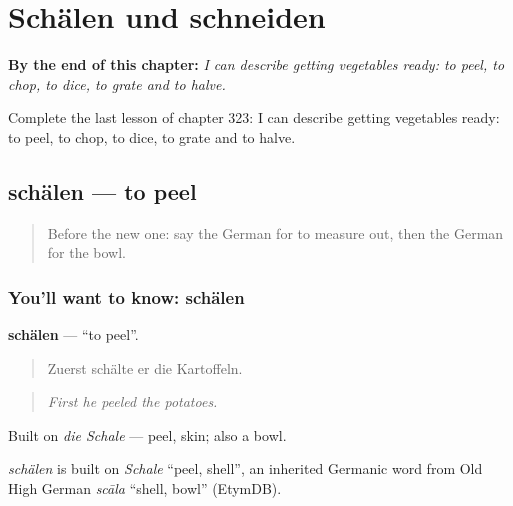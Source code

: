 
\chapter{Schälen und schneiden}
\label{ch:ge-schalen-und-schneiden}

\begin{chapteropening}
\textbf{By the end of this chapter:} \emph{I can describe getting vegetables ready: to peel, to chop, to dice, to grate and to halve.}

Complete the last lesson of chapter 323: I can describe getting vegetables ready: to peel, to chop, to dice, to grate and to halve.
\end{chapteropening}

\section[schälen]{schälen — to peel}

\label{lesson:GE-C323-schaelen}



\begin{quote}
Before the new one: say the German for to measure out, then the German for the bowl.
\end{quote}

\subsection*{You'll want to know: schälen}
\textbf{schälen} — \textquotedblleft{}to peel\textquotedblright{}.

\begin{quote}
Zuerst schälte er die Kartoffeln.
\end{quote}

\begin{quote}
\emph{First he peeled the potatoes.}
\end{quote}

Built on \emph{die Schale} — peel, skin; also a bowl.

\begin{cousinweb}
\emph{schälen} is built on \emph{Schale} \textquotedblleft{}peel, shell\textquotedblright{}, an inherited Germanic word from Old High German \emph{scāla} \textquotedblleft{}shell, bowl\textquotedblright{} (EtymDB).
\end{cousinweb}

